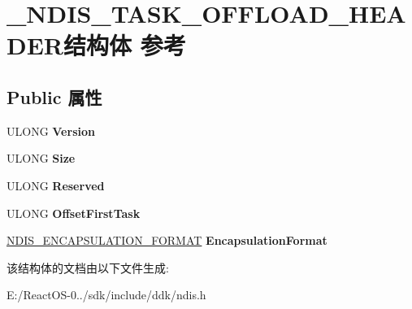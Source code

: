 \hypertarget{struct___n_d_i_s___t_a_s_k___o_f_f_l_o_a_d___h_e_a_d_e_r}{}\section{\+\_\+\+N\+D\+I\+S\+\_\+\+T\+A\+S\+K\+\_\+\+O\+F\+F\+L\+O\+A\+D\+\_\+\+H\+E\+A\+D\+E\+R结构体 参考}
\label{struct___n_d_i_s___t_a_s_k___o_f_f_l_o_a_d___h_e_a_d_e_r}
\subsection*{Public 属性}
\begin{DoxyCompactItemize}
\item 
\mbox{\label{struct___n_d_i_s___t_a_s_k___o_f_f_l_o_a_d___h_e_a_d_e_r_a491b1eddedf5e5daed7e2a87521d2ed5}} 
U\+L\+O\+NG {\bfseries Version}
\item 
\mbox{\label{struct___n_d_i_s___t_a_s_k___o_f_f_l_o_a_d___h_e_a_d_e_r_ad12efaada336ce441bab0da05ae4718e}} 
U\+L\+O\+NG {\bfseries Size}
\item 
\mbox{\label{struct___n_d_i_s___t_a_s_k___o_f_f_l_o_a_d___h_e_a_d_e_r_a94c7433baf880dd101033d0d096b9ac7}} 
U\+L\+O\+NG {\bfseries Reserved}
\item 
\mbox{\label{struct___n_d_i_s___t_a_s_k___o_f_f_l_o_a_d___h_e_a_d_e_r_afc043bd31c3fc1fb712b7229c0301699}} 
U\+L\+O\+NG {\bfseries Offset\+First\+Task}
\item 
\mbox{\label{struct___n_d_i_s___t_a_s_k___o_f_f_l_o_a_d___h_e_a_d_e_r_a44bf41a3b27d3b6eeb2e3afd2a9a19ac}} 
\hyperlink{struct___n_d_i_s___e_n_c_a_p_s_u_l_a_t_i_o_n___f_o_r_m_a_t}{N\+D\+I\+S\+\_\+\+E\+N\+C\+A\+P\+S\+U\+L\+A\+T\+I\+O\+N\+\_\+\+F\+O\+R\+M\+AT} {\bfseries Encapsulation\+Format}
\end{DoxyCompactItemize}


该结构体的文档由以下文件生成\+:\begin{DoxyCompactItemize}
\item 
E\+:/\+React\+O\+S-\/0../sdk/include/ddk/ndis.\+h\end{DoxyCompactItemize}
